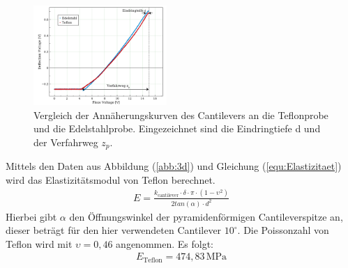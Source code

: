 \begin{figure}[hbtp]
	\centering
	\includegraphics[width=0.45\textwidth]{AFM_auswertung/elastizitaet.png}
	\caption{Vergleich der Annäherungskurven des Cantilevers an die Teflonprobe und die Edelstahlprobe. Eingezeichnet sind die Eindringtiefe d und der Verfahrweg $z_p$.}
	\label{abb:auf3c}
\end{figure}
Mittels den Daten aus Abbildung (\ref{abb:3d}) und Gleichung (\ref{equ:Elastizitaet}) wird das Elastizitätsmodul von Teflon berechnet.
\begin{align}
	E = \frac{k_{\text{cantilever}} \cdot \delta \cdot \pi \cdot \left( 1 - \upsilon^2 \right)}{2 tan(\alpha) \cdot d^2}
\label{equ:Elastizitaet}
\end{align}
Hierbei gibt $\alpha$ den Öffnungswinkel der pyramidenförmigen Cantileverspitze an, dieser betr\"agt f\"ur den hier verwendeten Cantilever $10^{\circ}$.
Die Poissonzahl von Teflon wird mit $\upsilon = 0,46$ angenommen.
Es folgt:
\begin{align*}
	E_{\text{Teflon}} = 474,83 \, \text{MPa}
\end{align*}